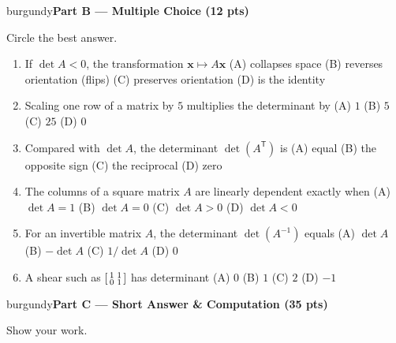 \documentclass[10pt]{article}
\newcommand{\xx}{\mathbf{x}}
\newcommand{\T}{^{\mathsf T}}
\newcommand{\parthead}[1]{%
  \vspace{6pt}\noindent
  \begin{headlinebox}{burgundy}{\color{white}\bfseries #1}\end{headlinebox}%
  \vspace{4pt}}
\begin{document}
\parthead{Part B --- Multiple Choice (12 pts)}
Circle the best answer.

\begin{enumerate}[leftmargin=1.9em, itemsep=9pt]
  \item If $\det A<0$, the transformation $\xx\mapsto A\xx$
    \hfill (A) collapses space \quad (B) reverses orientation (flips) \quad (C) preserves orientation \quad (D) is the identity
  \item Scaling one row of a matrix by $5$ multiplies the determinant by
    \hfill (A) $1$ \quad (B) $5$ \quad (C) $25$ \quad (D) $0$
  \item Compared with $\det A$, the determinant $\det(A\T)$ is
    \hfill (A) equal \quad (B) the opposite sign \quad (C) the reciprocal \quad (D) zero
  \item The columns of a square matrix $A$ are linearly dependent exactly when
    \hfill (A) $\det A=1$ \quad (B) $\det A=0$ \quad (C) $\det A>0$ \quad (D) $\det A<0$
  \item For an invertible matrix $A$, the determinant $\det(A^{-1})$ equals
    \hfill (A) $\det A$ \quad (B) $-\det A$ \quad (C) $1/\det A$ \quad (D) $0$
  \item A shear such as $\begin{bsmallmatrix}1&1\\0&1\end{bsmallmatrix}$ has determinant
    \hfill (A) $0$ \quad (B) $1$ \quad (C) $2$ \quad (D) $-1$
\end{enumerate}

\parthead{Part C --- Short Answer \& Computation (35 pts)}
Show your work.
\end{document}
